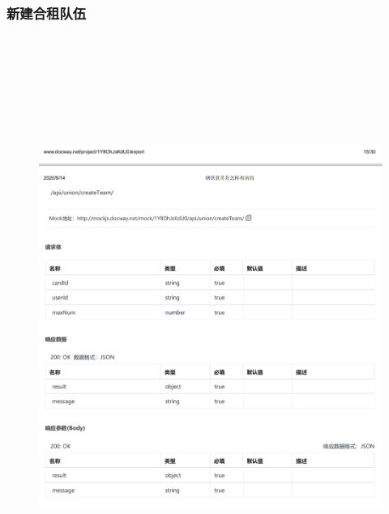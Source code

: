         \subsubsection{新建合租队伍}
        \begin{figure}[h]
            \centering
            \includegraphics[height=19.0cm,width=14.0cm]{design/image/api16.png} 
            \end{figure}  
            \newpage                                  
